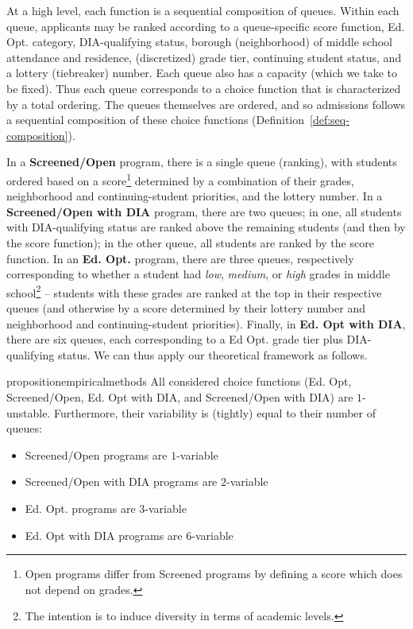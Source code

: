 \documentclass[letterpaper]{article}
\begin{document}
At a high level, each function is a sequential composition of queues.
Within each queue, applicants may be ranked according to a queue-specific score function, Ed. Opt. category, DIA-qualifying status, borough (neighborhood) of middle school attendance and residence, (discretized) grade tier, continuing student status, and a lottery (tiebreaker) number. Each queue also has a capacity (which we take to be fixed).
Thus each queue corresponds to a choice function that is characterized by a total ordering.
The queues themselves are ordered, and so admissions follows a sequential composition of these choice functions (Definition~\ref{def:seq-composition}).

In a \textbf{Screened/Open} program, there is a single queue (ranking), with students ordered based on a score\footnote{Open programs differ from Screened programs by defining a score which does not depend on grades.} determined by a combination of their grades, neighborhood and continuing-student priorities, and the lottery number. In a \textbf{Screened/Open with DIA} program, there are two queues; in one, all students with DIA-qualifying status are ranked above the remaining students (and then by the score function); in the other queue, all students are ranked by the score function. In an \textbf{Ed. Opt.} program, there are three queues, respectively corresponding to whether a student had \textit{low}, \textit{medium}, or \textit{high} grades in middle school\footnote{The intention is to induce diversity in terms of academic levels.} -- students with these grades are ranked at the top in their respective queues (and otherwise by a score determined by their lottery number and neighborhood and continuing-student priorities). Finally, in \textbf{Ed. Opt with DIA}, there are six queues, each corresponding to a Ed Opt. grade tier plus DIA-qualifying status. We can thus apply our theoretical framework as follows.

\begin{restatable}[]{proposition}{empiricalmethods}
\label{prop:program-variability}
All considered choice functions ({Ed. Opt}, {Screened/Open}, {Ed. Opt with DIA}, and {Screened/Open with DIA}) are $1$-unstable. Furthermore, their variability is (tightly) equal to their number of queues:

\begin{itemize}[noitemsep,topsep=0pt,parsep=0pt,partopsep=0pt]
    \item Screened/Open programs are $1$-variable
    \item Screened/Open with DIA programs are $2$-variable
    \item Ed. Opt. programs are $3$-variable
    \item Ed. Opt with DIA programs are $6$-variable
\end{itemize}

\end{restatable}
\end{document}
